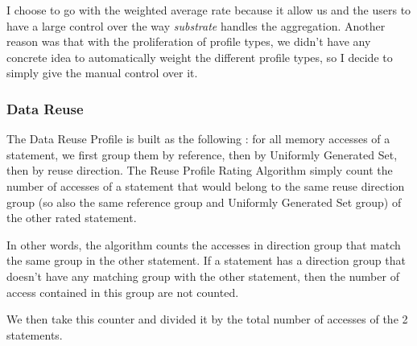 \documentclass[paper=a4, fontsize=11pt]{scrartcl}
\numberwithin{equation}{section}        %
\numberwithin{figure}{section}          %
\numberwithin{table}{section}               %
\begin{document}
    I choose to go with the weighted average rate because it allow us and the users
    to have a large control over the way \textit{substrate} handles the aggregation.
    Another reason was that with the proliferation of profile types, we didn't have
    any concrete idea to automatically weight the different profile types, so I decide
    to simply give the manual control over it.
        \subsubsection{Data Reuse}
            The Data Reuse Profile is built as the following : for all memory accesses of
            a statement, we first group them by reference, then by Uniformly Generated Set,
            then by reuse direction. The Reuse Profile Rating Algorithm simply count
            the number of accesses of a statement that would belong to the same reuse
            direction group (so also the same reference group and Uniformly Generated Set group)
            of the other rated statement.
            
            In other words, the algorithm counts the accesses in direction group that match
            the same group in the other statement. If a statement has a direction group that doesn't
            have any matching group with the other statement, then the number of access contained
            in this group are not counted.

            We then take this counter and divided it by the total number of accesses of
            the 2 statements.
\end{document}
